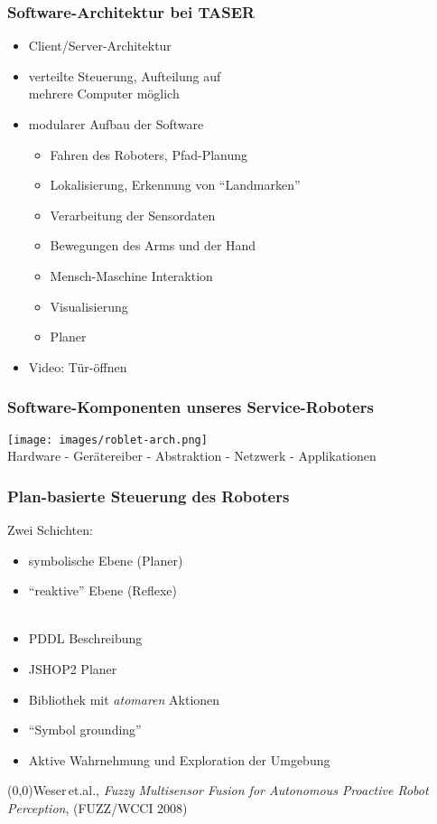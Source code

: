 \documentclass[t]{beamer}
\def\quelle#1{{\tiny \makebox(0,0){}\vfill\hfill #1}}
\begin{document}
\begin{frame}
\frametitle{Software-Architektur bei TASER}
%
\vspace*{-5mm}
\begin{itemize}
\item Client/Server-Architektur
\item verteilte Steuerung, Aufteilung auf\\
      mehrere Computer möglich
\item modularer Aufbau der Software
      \begin{itemize}
      \item Fahren des Roboters, Pfad-Planung
      \item Lokalisierung, Erkennung von "`Landmarken"'
      \item Verarbeitung der Sensordaten
      \item Bewegungen des Arms und der Hand
      \item Mensch-Maschine Interaktion
      \item Visualisierung
      \item Planer
      \end{itemize}
\item Video: Tür-öffnen
\end{itemize}
\end{frame}


\begin{frame}
\frametitle{Software-Komponenten unseres Service-Roboters}
\texttt{[image: images/roblet-arch.png]}\\
Hardware - Gerätereiber - Abstraktion - Netzwerk - Applikationen
\end{frame}


\begin{frame}
\frametitle{Plan-basierte Steuerung des Roboters}
%
Zwei Schichten:
\begin{itemize}
\item symbolische Ebene (Planer)
\item "`reaktive"' Ebene (Reflexe)
      \\~
\item PDDL Beschreibung
\item JSHOP2 Planer
\item Bibliothek mit {\em atomaren} Aktionen
\item "`Symbol grounding"'
\item Aktive Wahrnehmung und Exploration der Umgebung
\end{itemize}
\quelle{Weser\,et.al., 
{\em Fuzzy Multisensor Fusion for Autonomous Proactive Robot Perception}, 
(FUZZ/WCCI 2008)}
\end{frame}
\end{document}
